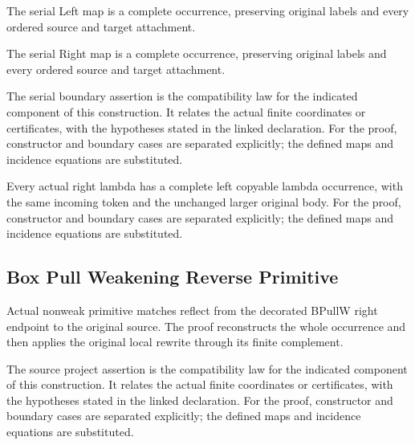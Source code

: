 The serial Left map is a complete occurrence, preserving original labels and every ordered source and target attachment.
\par{}

The serial Right map is a complete occurrence, preserving original labels and every ordered source and target attachment.
\par{}

The serial boundary assertion is the compatibility law for the indicated component of this construction. It relates the actual finite coordinates or certificates, with the hypotheses stated in the linked declaration.
For the proof, constructor and boundary cases are separated explicitly; the defined maps and incidence equations are substituted.
\par{}

Every actual right lambda has a complete left copyable lambda occurrence, with the same incoming token and the unchanged larger original body.
For the proof, constructor and boundary cases are separated explicitly; the defined maps and incidence equations are substituted.
\par{}

\subsection{Box Pull Weakening Reverse Primitive}
Actual nonweak primitive matches reflect from the decorated BPullW right endpoint to the original source. The proof reconstructs the whole occurrence and then applies the original local rewrite through its finite complement.

The source project assertion is the compatibility law for the indicated component of this construction. It relates the actual finite coordinates or certificates, with the hypotheses stated in the linked declaration.
For the proof, constructor and boundary cases are separated explicitly; the defined maps and incidence equations are substituted.
\par{}

